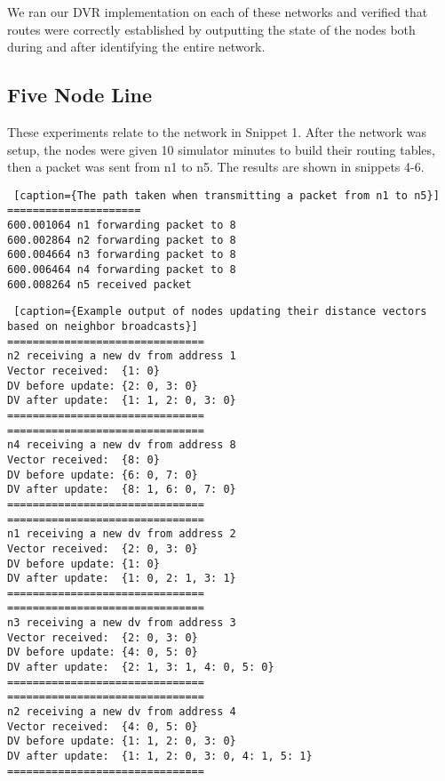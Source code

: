 \documentclass[11pt]{article}
\begin{document}
We ran our DVR implementation on each of these networks and verified that routes were correctly established by outputting the state of the nodes both during and after identifying the entire network.

\subsection{Five Node Line}

These experiments relate to the network in Snippet 1. After the network was setup, the nodes were given 10 simulator minutes to build their routing tables, then a packet was sent from n1 to n5. The results are shown in snippets 4-6.

 \begin{lstlisting} [caption={The path taken when transmitting a packet from n1 to n5}]
=====================
600.001064 n1 forwarding packet to 8
600.002864 n2 forwarding packet to 8
600.004664 n3 forwarding packet to 8
600.006464 n4 forwarding packet to 8
600.008264 n5 received packet
\end{lstlisting}

 \begin{lstlisting} [caption={Example output of nodes updating their distance vectors based on neighbor broadcasts}]
===============================
n2 receiving a new dv from address 1
Vector received:  {1: 0}
DV before update: {2: 0, 3: 0}
DV after update:  {1: 1, 2: 0, 3: 0}
===============================
===============================
n4 receiving a new dv from address 8
Vector received:  {8: 0}
DV before update: {6: 0, 7: 0}
DV after update:  {8: 1, 6: 0, 7: 0}
===============================
===============================
n1 receiving a new dv from address 2
Vector received:  {2: 0, 3: 0}
DV before update: {1: 0}
DV after update:  {1: 0, 2: 1, 3: 1}
===============================
===============================
n3 receiving a new dv from address 3
Vector received:  {2: 0, 3: 0}
DV before update: {4: 0, 5: 0}
DV after update:  {2: 1, 3: 1, 4: 0, 5: 0}
===============================
===============================
n2 receiving a new dv from address 4
Vector received:  {4: 0, 5: 0}
DV before update: {1: 1, 2: 0, 3: 0}
DV after update:  {1: 1, 2: 0, 3: 0, 4: 1, 5: 1}
===============================
\end{lstlisting}
\end{document}

